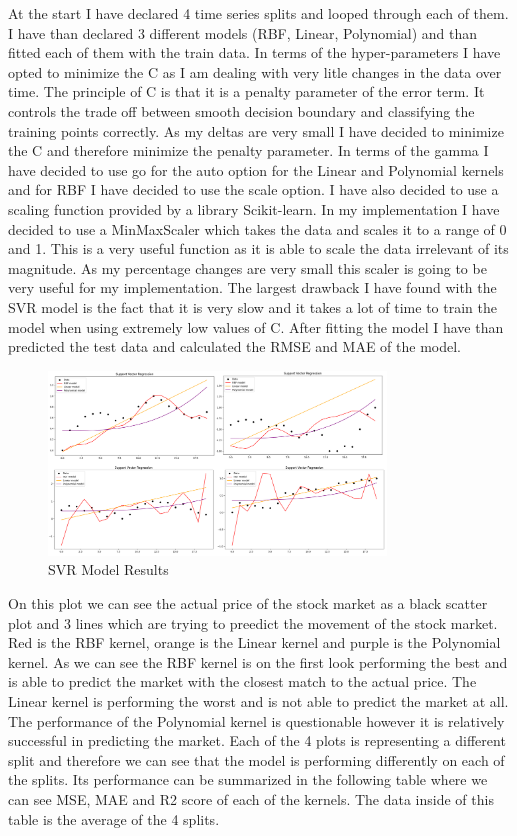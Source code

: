 \documentclass{imc-inf}
\begin{document}
	At the start I have declared 4 time series splits and looped through each of them. I have than declared 3 different models (RBF, Linear, Polynomial) and than fitted each of them with the train data.
	In terms of the hyper-parameters I have opted to minimize the C as I am dealing with very litle changes in the data over time. The principle of C is that it is a penalty parameter of the error term.
	It controls the trade off between smooth decision boundary and classifying the training points correctly. As my deltas are very small I have decided to minimize the C and therefore minimize the penalty parameter. 
	In terms of the gamma I have decided to use go for the auto option for the Linear and Polynomial kernels and for RBF I have decided to use the scale option. I have also decided to use a scaling function
	provided by a library Scikit-learn. In my implementation I have decided to use a MinMaxScaler which takes the data and scales it to a range of 0 and 1. This is a very useful function as it is able to scale the data 
	irrelevant of its magnitude. As my percentage changes are very small this scaler is going to be very useful for my implementation.
	The largest drawback I have found with the SVR model is the fact that it is very slow and it takes a lot of time to train the model when using extremely low values of C. 
	After fitting the model I have than predicted the test data and calculated the RMSE and MAE of the model.
	\begin{figure}[h]
		\centering
		\includegraphics[width=0.8\textwidth]{svr_chart.png}
		\caption{SVR Model Results}
		\label{fig:svr_model_plots}
	\end{figure}
	On this plot we can see the actual price of the stock market as a black scatter plot and 3 lines which are trying to preedict the movement of the stock market. Red is the RBF kernel, orange is the Linear kernel and purple is the Polynomial kernel.
	As we can see the RBF kernel is on the first look performing the best and is able to predict the market with the closest match to the actual price. The Linear kernel is performing the worst and is not able to predict the market at all.
	The performance of the Polynomial kernel is questionable however it is relatively successful in predicting the market. Each of the 4 plots is representing a different split and therefore we can see that the model is performing differently on each of the splits.
	Its performance can be summarized in the following table where we can see MSE, MAE and R2 score of each of the kernels. The data inside of this table is the average of the 4 splits.
	
\end{document}
